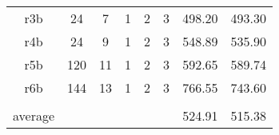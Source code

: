 \begin{landscape}
\begin{table}[]
\begin{tabular}{ccclllll}
r3b     & 24                   &7                   & \multicolumn{1}{r}{1}    & \multicolumn{1}{r}{2}     & \multicolumn{1}{r}{3}   & \multicolumn{1}{r}{498.20}    & \multicolumn{1}{r}{493.30}     \\
r4b     & 24                   & 9                   & \multicolumn{1}{r}{1}    & \multicolumn{1}{r}{2}     & \multicolumn{1}{r}{3}   & \multicolumn{1}{r}{548.89}    & \multicolumn{1}{r}{535.90}     \\
r5b     & 120                 & 11                   & \multicolumn{1}{r}{1}    & \multicolumn{1}{r}{2}     & \multicolumn{1}{r}{3}   & \multicolumn{1}{r}{592.65}    & \multicolumn{1}{r}{589.74}     \\
r6b     & 144               & 13                   & \multicolumn{1}{r}{1}    & \multicolumn{1}{r}{2}     & \multicolumn{1}{r}{3}   & \multicolumn{1}{r}{766.55}    & \multicolumn{1}{r}{743.60}     \\
        & \multicolumn{1}{l}{} & \multicolumn{1}{l}{} &                          &                           &                         &                          &                           \\
average & \multicolumn{1}{l}{} & \multicolumn{1}{l}{} &                          &                           &                         &       \multicolumn{1}{r}{524.91 }                    &       \multicolumn{1}{r}{515.38}                     \\ \hline
\end{tabular}
\end{table}
\end{landscape}



